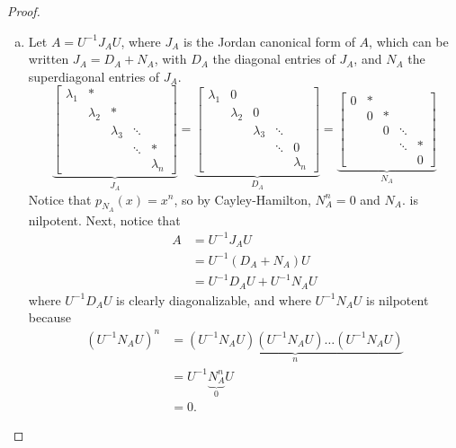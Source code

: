 \documentclass{article}
\begin{document}
\begin{proof} ~
  \begin{enumerate}[(a)]
    \item   Let $A = U^{-1} J_A U$, where $J_A$ is the Jordan canonical form of $A$, which
      can be written $J_A = D_A + N_A$, with $D_A$ the diagonal entries of $J_A$,
      and $N_A$ the superdiagonal entries of $J_A$. \[
        \underbrace{
          \begin{bmatrix}
            \lambda_1 & * & \ & \ & \ \\
            \ & \lambda_2 & * & \ & \ \\
            \ & \ & \lambda_3 & \ddots & \ \\
            \ & \ & \ & \ddots & * \\
            \ & \ & \ & \ & \lambda_n
          \end{bmatrix}
        }_{J_A}
        = \underbrace{
          \begin{bmatrix}
            \lambda_1 & 0         & \         & \      & \ \\
            \         & \lambda_2 & 0         & \      & \ \\
            \         & \         & \lambda_3 & \ddots & \ \\
            \         & \         & \         & \ddots & 0 \\
            \         & \         & \         & \      & \lambda_n
          \end{bmatrix}
        }_{D_A}
        = \underbrace{
          \begin{bmatrix}
            0 & * & \ & \      & \ \\
            \ & 0 & * & \      & \ \\
            \ & \ & 0 & \ddots & \ \\
            \ & \ & \ & \ddots & * \\
            \ & \ & \ & \      & 0
          \end{bmatrix}
        }_{N_A}
      \]
      Notice that $p_{N_A}(x) = x^n$, so by Cayley-Hamilton, $N_A^n = 0$ and $N_A$.
      is nilpotent.
      Next, notice that \begin{align*}
        A
        &= U^{-1} J_A U \\
        &= U^{-1} (D_A + N_A) U \\
        &= U^{-1} D_A U + U^{-1} N_A U
      \end{align*} where $U^{-1} D_A U$ is clearly diagonalizable, and where
      $U^{-1} N_A U$ is nilpotent because \begin{align*}
        (U^{-1} N_A U)^n
          &= \underbrace{(U^{-1} N_A U)(U^{-1} N_A U)\hdots(U^{-1} N_A U)}_{n} \\
          &= U^{-1} \underbrace{N_A^n}_0 U \\
          &= 0.
      \end{align*}
  \end{enumerate}
\end{proof}
\end{document}
